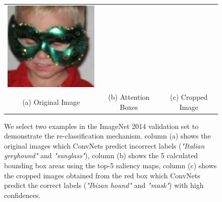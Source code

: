 \begin{figure}[htb]
\begin{center}
\begin{tabular}{ccc}
\includegraphics[width=0.33\linewidth,height=0.3\linewidth]{figs/re-classification/crop_image/ILSVRC2012_val_00000608} \\
{\small (a) Original Image} &
{\small (b) Attention Boxes} &
{\small (c) Cropped Image} \\
\end{tabular}
\caption{We select two examples in the ImageNet 2014 validation set to demonstrate the re-classification mechanism. column (a) shows the original images which ConvNets predict incorrect labels ({\em "Italian greyhound"} and {\em "sunglass"}), column (b) shows the 5 calculated bounding box areas using the top-5 saliency maps, column (c) shows the cropped images obtained from the red box which ConvNets predict the correct labels ({\em "Ibizan hound"} and {\em "mask"}) with high confidences.}

\label{fig:reclassification_examples}
\end{center}
\end{figure}


